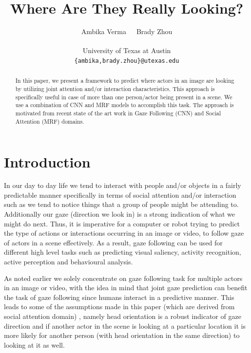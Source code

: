 \documentclass[10pt,twocolumn,letterpaper]{article}
\begin{document}
\title{Where Are They Really Looking?}

\author{
Ambika Verma\ \ \ Brady Zhou\\ \\
{\fontsize{11}{13}\selectfont University of Texas at Austin}\\
{\fontsize{10}{11}\selectfont \texttt{\{ambika,brady.zhou\}@utexas.edu}}
}

\maketitle

\begin{abstract}
    In this paper, we present a framework to predict where actors in an image are looking by utilizing joint attention and/or interaction characteristics. This approach is specifically useful in case of more than one person/actor being present in a scene. We use a combination of CNN \cite{nips15_recasens} and MRF \cite{fathi2012social} models to accomplish this task. The approach is motivated from recent state of the art work in Gaze Following (CNN) and Social Attention (MRF) domains.
\end{abstract}

\section{Introduction}

In our day to day life we tend to interact with people and/or objects in a fairly predictable manner specifically in terms of social attention and/or interaction such as we tend to notice things that a group of people might be attending to. Additionally our gaze (direction we look in) is a strong indication of what we might do next. Thus, it is imperative for a computer or robot trying to predict the type of actions or interactions occurring in an image or video, to follow gaze of actors in a scene effectively. As a result, gaze following can be used for different high level tasks such as predicting visual saliency, activity recognition, active perception and behavioural analysis.

As noted earlier we solely concentrate on gaze following task for multiple actors in an image or video, with the idea in mind that joint gaze prediction can benefit the task of gaze following since humans interact in a predictive manner. This leads to some of the assumptions made in this paper (which are derived from social attention domain) \cite{fathi2012social}, namely head orientation is a robust indicator of gaze direction and if another actor in the scene is looking at a particular location it is more likely for another person (with head orientation in the same direction) to looking at it as well.
\end{document}
